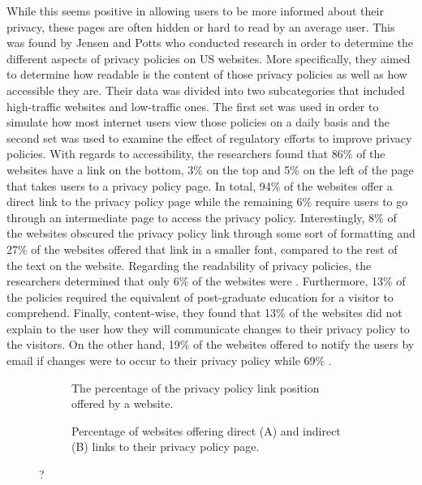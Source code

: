 \documentclass[../main.tex]{subfiles}
\begin{document}
While this seems positive in allowing users to be more informed about their privacy, these pages are often hidden or hard to read by an average user. This was found by Jensen and Potts \cite{jensen2004privacy} who conducted research in order to determine the different aspects of privacy policies on US websites. More specifically, they aimed to determine how readable is the content of those privacy policies as well as how accessible they are. Their data was divided into two subcategories that included high-traffic websites and low-traffic ones. The first set was used in order to simulate how most internet users view those policies on a daily basis and the second set was used to examine the effect of regulatory efforts to improve privacy policies. With regards to accessibility, the researchers found that 86\% of the websites have a link on the bottom, 3\% on the top and 5\% on the left of the page that takes users to a privacy policy page. In total, 94\% of the websites offer a direct link to the privacy policy page while the remaining 6\% require users to go through an intermediate page to access the privacy policy. Interestingly, 8\% of the websites obscured the privacy policy link through some sort of formatting and 27\% of the websites offered that link in a smaller font, compared to the rest of the text on the website. Regarding the readability of privacy policies, the researchers determined that only 6\% of the websites were . Furthermore, 13\% of the policies required the equivalent of post-graduate education for a visitor to comprehend. Finally, content-wise, they found that 13\% of the websites did not explain to the user how they will communicate changes to their privacy policy to the visitors. On the other hand, 19\% of the websites offered to notify the users by email if changes were to occur to their privacy policy while 69\% .

\begin{figure}[ht]
    \centering
    \begin{subfigure}[b]{0.45\textwidth}
        \centering
        \caption{The percentage of the privacy policy link position offered by a website.}
        \label{tab:jensen_a}
    \end{subfigure}
    \hfill
    \begin{subfigure}[b]{0.45\textwidth}
        \centering
        \caption{Percentage of websites offering direct (A) and indirect (B) links to their privacy policy page.}
        \label{fig:jensen_b}
    \end{subfigure}
    \caption{?}
    \label{fig:jensen}
\end{figure}
\end{document}
